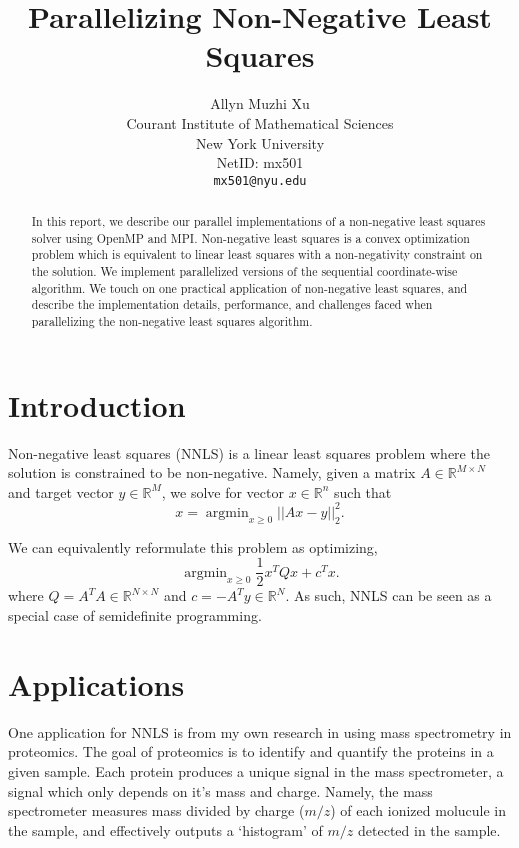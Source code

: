 \documentclass{article}
\title{Parallelizing Non-Negative Least Squares}
\author{Allyn Muzhi Xu \\
	Courant Institute of Mathematical Sciences\\
	New York University\\
	NetID: mx501\\
	\texttt{mx501@nyu.edu} \\
}
\DeclareMathOperator*{\argmin}{\text{argmin}}
\begin{document}
\maketitle

\begin{abstract}
	In this report, we describe our parallel implementations of a non-negative least squares solver using OpenMP and MPI. Non-negative least squares is a convex optimization problem which is equivalent to linear least squares with a non-negativity constraint on the solution. We implement parallelized versions of the sequential coordinate-wise algorithm. We touch on one practical application of non-negative least squares, and describe the implementation details, performance, and challenges faced when parallelizing the non-negative least squares algorithm. 
\end{abstract}



\section{Introduction}
Non-negative least squares (NNLS) is a linear least squares problem where the solution is constrained to be non-negative. Namely, given a matrix $A \in \mathbb R^{M \times N}$ and target vector $y \in \mathbb R^M$, we solve for vector $x \in \mathbb R^n$ such that
\begin{equation}\label{eq:nnls}
    x = \argmin_{x \geq 0} || Ax - y ||_2^2.
\end{equation} 

We can equivalently reformulate this problem as optimizing,
\begin{equation} \label{eq:qnnls}
    \argmin_{x \geq 0} \frac{1}{2} x^T Q x + c^T x .
\end{equation}
where $Q = A^T A \in \mathbb R^{N \times N}$ and $c = -A^T y \in \mathbb R^N$. As such, NNLS can be seen as a special case of semidefinite programming.

\section{Applications}
One application for NNLS is from my own research in using mass spectrometry in proteomics. The goal of proteomics is to identify and quantify the proteins in a given sample. Each protein produces a unique signal in the mass spectrometer, a signal which only depends on it's mass and charge. Namely, the mass spectrometer measures mass divided by charge ($m/z$) of each ionized molucule in the sample, and effectively outputs a `histogram' of $m/z$ detected in the sample. 
\end{document}
